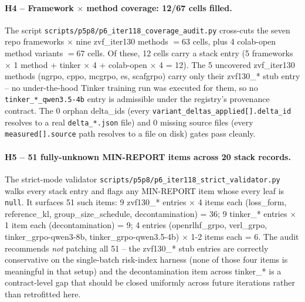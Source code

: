 \paragraph{H4 -- Framework $\times$ method coverage: 12/67 cells filled.}
The script \texttt{scripts/p5p8/p6\_iter118\_coverage\_audit.py} cross-cuts
the seven repo frameworks $\times$ nine zvf\_iter130 methods $= 63$ cells,
plus 4 colab-open method variants $= 67$ cells. Of these, 12 cells carry
a stack entry (5 frameworks $\times$ {1 method} + tinker $\times$ 4 +
colab-open $\times$ 4 = 12). The 5 uncovered zvf\_iter130 methods (ngrpo,
cppo, mcgrpo, es, scafgrpo) carry only their zvf130\_* stub entry -- no
under-the-hood Tinker training run was executed for them, so no
\texttt{tinker\_*\_qwen3.5-4b} entry is admissible under the registry's
provenance contract. The 0 orphan delta\_ids (every
\texttt{variant\_deltas\_applied[].delta\_id} resolves to a real
\texttt{delta\_*.json} file) and 0 missing source files (every
\texttt{measured[].source} path resolves to a file on disk) gates pass
cleanly.

\paragraph{H5 -- 51 fully-unknown MIN-REPORT items across 20 stack records.}
The strict-mode validator \texttt{scripts/p5p8/p6\_iter118\_strict\_validator.py}
walks every stack entry and flags any MIN-REPORT item whose every leaf is
\texttt{null}. It surfaces 51 such items:
9 zvf130\_* entries $\times$ 4 items each (loss\_form, reference\_kl,
group\_size\_schedule, decontamination) = 36; 9 tinker\_* entries
$\times$ 1 item each (decontamination) = 9; 4 entries
(openrlhf\_grpo, verl\_grpo, tinker\_grpo-qwen3-8b, tinker\_grpo-qwen3.5-4b)
$\times$ 1-2 items each = 6. The audit recommends \emph{not} patching all
51 -- the zvf130\_* stub entries are correctly conservative on the
single-batch risk-index harness (none of those four items is meaningful
in that setup) and the decontamination item across tinker\_* is a
contract-level gap that should be closed uniformly across future
iterations rather than retrofitted here.

